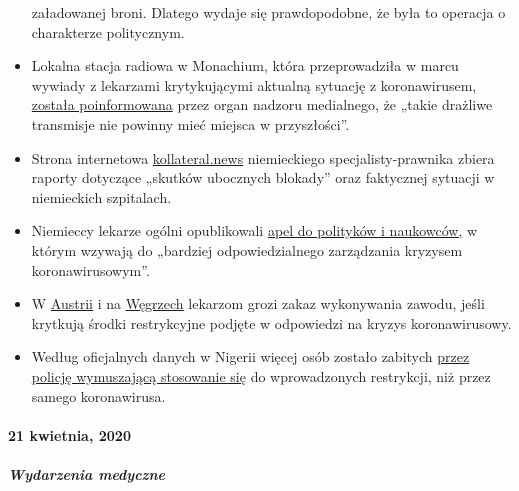 \begin{itemize}
  załadowanej broni. Dlatego wydaje się prawdopodobne, że była to
  operacja o charakterze politycznym.
\item
  Lokalna stacja radiowa w Monachium, która przeprowadziła w marcu
  wywiady z lekarzami krytykującymi aktualną sytuację z koronawirusem,
  \href{https://norberthaering.de/medienversagen/radiomuenchen-blm-meinungsvielfalt/}{została
  poinformowana} przez organ nadzoru medialnego, że „takie drażliwe
  transmisje nie powinny mieć miejsca w przyszłości''.
\item
  Strona internetowa \href{https://kollateral.news/}{kollateral.news}
  niemieckiego specjalisty-prawnika zbiera raporty dotyczące „skutków
  ubocznych blokady'' oraz faktycznej sytuacji w niemieckich szpitalach.
\item
  Niemieccy lekarze ogólni opublikowali
  \href{https://aerzteinnenvorort.de/der-appell}{apel do polityków i
  naukowców,} w którym wzywają do „bardziej odpowiedzialnego zarządzania
  kryzysem koronawirusowym''.
\item
  W
  \href{https://www.sn.at/panorama/oesterreich/arzt-droht-berufsverbot-wegen-kritik-an-corona-massnahmen-86594140}{Austrii}
  i na
  \href{https://magyarhang.org/belfold/2020/04/16/etikai-vizsgalat-indul-az-orvos-ellen-aki-szerint-nincs-jarvany-es-az-idosek-csak-a-felelemtol-halnak-meg/}{Węgrzech}
  lekarzom grozi zakaz wykonywania zawodu, jeśli krytkują środki
  restrykcyjne podjęte w odpowiedzi na kryzys koronawirusowy.
\item
  Według oficjalnych danych w Nigerii więcej osób zostało zabitych
  \href{https://www.bbc.com/news/world-africa-52317196}{przez policję
  wymuszającą stosowanie się} do wprowadzonych restrykcji, niż przez
  samego koronawirusa.
\end{itemize}

\hypertarget{21-kwietnia-2020}{%
\paragraph{21 kwietnia, 2020}\label{21-kwietnia-2020}}

\hypertarget{wydarzenia-medyczne-1}{%
\subparagraph{\texorpdfstring{\textbf{Wydarzenia
medyczne}}{Wydarzenia medyczne}}\label{wydarzenia-medyczne-1}}

